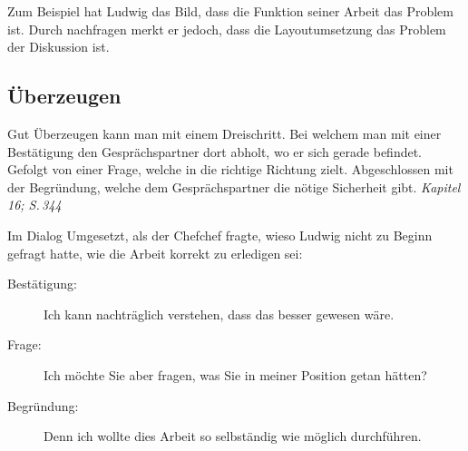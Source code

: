 Zum Beispiel hat Ludwig das Bild, dass die Funktion seiner
Arbeit das Problem ist. Durch nachfragen merkt er jedoch, dass die
Layoutumsetzung das Problem der Diskussion ist.
\subsection*{Überzeugen}
Gut Überzeugen kann man mit einem Dreischritt.  Bei welchem man mit
einer Bestätigung den Gesprächspartner dort abholt, wo er sich gerade
befindet.  Gefolgt von einer Frage, welche in die richtige Richtung
zielt.  Abgeschlossen mit der Begründung, welche dem Gesprächspartner
die nötige Sicherheit gibt. \emph{Kapitel 16; S.\,344}

Im Dialog Umgesetzt, als der Chefchef fragte, wieso Ludwig nicht zu
Beginn gefragt hatte, wie die Arbeit korrekt zu erledigen sei:
\begin{description}
  \item[Bestätigung:] Ich kann nachträglich verstehen, dass das besser
    gewesen wäre.
  \item[Frage:] Ich möchte Sie aber fragen, was Sie in meiner Position
    getan hätten?
  \item[Begründung:] Denn ich wollte dies Arbeit so selbständig wie
    möglich durchführen.
\end{description}




